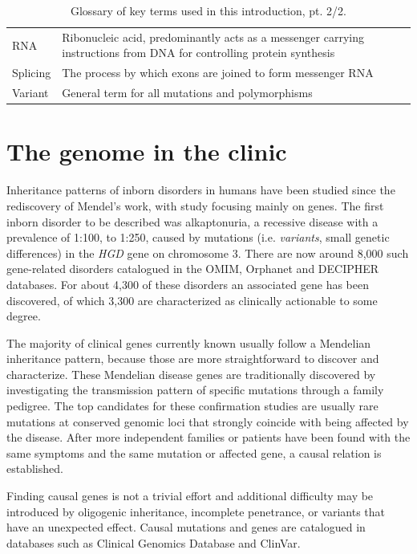 \begin{table}
\begin{tabulary}{\linewidth}{LL}
  \rule{0pt}{2.5ex}RNA & Ribonucleic acid, predominantly acts as a messenger carrying instructions from DNA for controlling protein synthesis \\
  \rule{0pt}{2.5ex}Splicing & The process by which exons are joined to form messenger RNA \\
  \rule{0pt}{2.5ex}Variant & General term for all mutations and polymorphisms \\
  \hline
\end{tabulary}
\caption[Glossary of key terms, pt. 2/2.]{\label{table:introduction_glossary_2} Glossary of key terms used in this introduction, pt. 2/2.}
\end{table}


\section{The genome in the clinic} \label{intro_clingen}
Inheritance patterns of inborn disorders in humans have been studied since the rediscovery of Mendel's work, with study focusing mainly on genes.
The first inborn disorder to be described was al\-kap\-to\-nu\-ria\cite{Garrod_1902}, a recessive disease with a pre\-va\-len\-ce of 1:100, to 1:250,\cite{Zatkova_2011} caused by mutations (i.e. \textsl{variants}, small genetic differences) in the \textsl{HGD} gene on chromosome 3.
There are now around 8,000 such gene-related disorders catalogued in the OMIM\cite{Hamosh_2000}, Orphanet\cite{Orphanet} and DECIPHER\cite{Firth_2009} databases.
For about 4,300 of these disorders an associated gene has been discovered, of which 3,300 are characterized as clinically actionable to some degree\cite{Solomon_2013}.

The majority of clinical genes currently known usually follow a Men\-de\-li\-an inheritance pattern, because those are more straightforward to discover and characterize.
These Mendelian disease genes are traditionally discovered by investigating the transmission pattern of specific mutations through a family pedigree.
The top candidates for these confirmation studies are usually rare mutations at conserved genomic loci that strongly coincide with being affected by the disease.
After more independent families or patients have been found with the same symptoms and the same mutation or affected gene\cite{Sobreira_2015}, a causal relation is established\cite{Cnossen_2014}.

Finding causal genes is not a trivial effort and additional difficulty may be introduced by oligogenic inheritance\cite{Gazzo_2015}, incomplete pe\-ne\-tran\-ce\cite{Shawky_2014,Natarajan_2016}, or variants that have an unexpected effect\cite{Eriksson_2003}.
Causal mutations and genes are catalogued in databases such as Clinical Genomics Database\cite{Solomon_2013} and ClinVar\cite{Landrum_2013}.

